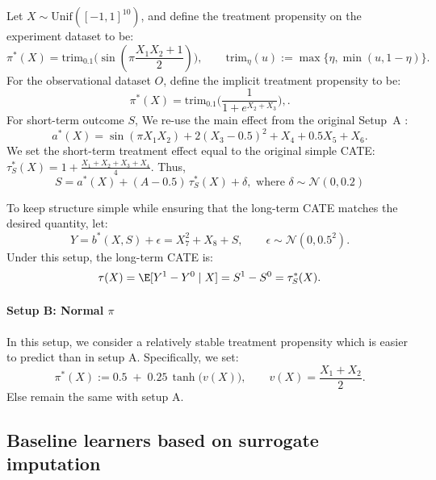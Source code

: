 \documentclass{article} %
\theoremstyle{plain} %
\theoremstyle{definition} %
\theoremstyle{remark} %
\begin{document}
Let $X \sim \mathrm{Unif}([-1,1]^{10})$, and define the treatment propensity on the experiment dataset to be:
\begin{equation}
    \pi^*(X)
    = \mathrm{trim}_{0.1}\!\big(\sin(\pi \frac{X_1 X_2 + 1}{2})\big),
    \qquad
    \mathrm{trim}_{\eta}(u)
    := \max\{\eta,\min(u,1-\eta)\}.
\end{equation}
For the observational dataset $O$, define the implicit treatment propensity to be:
\begin{equation}
    \pi^*(X)
    = \mathrm{trim}_{0.1}\!\big(\frac{1}{1 + e^{X_2 + X_3}}\big),.
\end{equation}
For short-term outcome $S$, We re-use the main effect from the original Setup~A \cite{Nie.2021}:
\begin{equation}
    a^*(X)
    = \sin(\pi X_1 X_2)
      + 2(X_3 - 0.5)^2
      + X_4 + 0.5 X_5 + X_6.
\end{equation}
We set the short-term treatment effect equal to the original simple CATE: $\tau_S^*(X) = 1 +\frac{X_1 + X_2 + X_3 + X_4}{4}.$ Thus,
\begin{equation}
    S
    = a^*(X)
      + (A - 0.5)\,\tau_S^*(X)
      + \delta, \text{ where } \delta\sim \mathcal{N}(0,0.2)
\end{equation}

To keep structure simple while ensuring that the long-term CATE matches the desired quantity, let:
\begin{equation}
    Y = b^*(X,S) + \epsilon=X_7^2 + X_8 + S,
    \qquad
    \epsilon \sim \mathcal{N}(0,0.5^2).
\end{equation}
Under this setup, the long-term CATE is:
\begin{equation}
\label{eq:setupA-cate}
    \tau(X)
    = \E[Y^1 - Y^0 \mid X]
    = S^1 - S^0
    = \tau_S^*(X).
\end{equation}

\paragraph{Setup B: Normal $\pi$}
In this setup, we consider a relatively stable treatment propensity which is easier to predict than in setup A. Specifically, we set:
\begin{equation}
    \pi^*(X)
    := 0.5 \;+\; 0.25 \,\tanh\!\big(v(X)\big), \qquad v(X)= \frac{X_1 + X_2}{2}.
\end{equation}
Else remain the same with setup A.
%
%
%
%
%
\subsection{Baseline learners based on surrogate imputation}
\label{sec:baselines}
\end{document}
